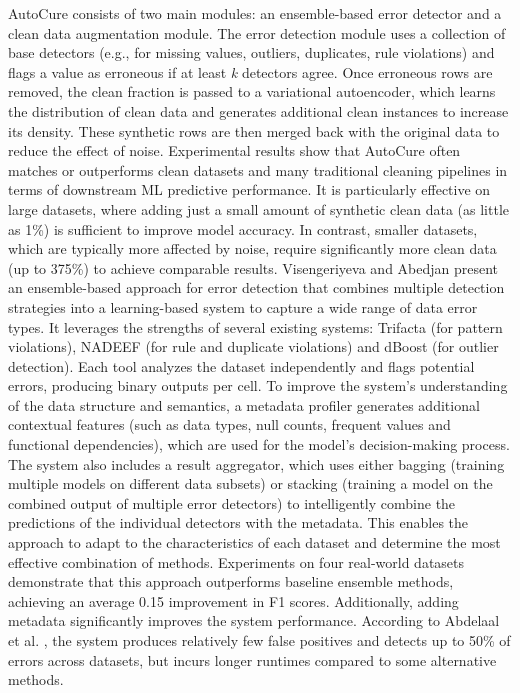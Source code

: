AutoCure consists of two main modules: an ensemble-based error detector and a clean data augmentation module. 
The error detection module uses a collection of base detectors (e.g., for missing values, outliers, duplicates, rule violations) and flags a value as erroneous if at least \textit{k} detectors agree. 
Once erroneous rows are removed, the clean fraction is passed to a variational autoencoder, which learns the distribution of clean data and generates additional clean instances to increase its density. 
These synthetic rows are then merged back with the original data to reduce the effect of noise.
Experimental results show that AutoCure often matches or outperforms clean datasets and many traditional cleaning pipelines in terms of downstream ML predictive performance. 
It is particularly effective on large datasets, where adding just a small amount of synthetic clean data (as little as 1\%) is sufficient to improve model accuracy. 
In contrast, smaller datasets, which are typically more affected by noise, require significantly more clean data (up to 375\%) to achieve comparable results.
\newline\newline
Visengeriyeva and Abedjan \cite{METADRIVEN} present an ensemble-based approach for error detection that combines multiple detection strategies into a learning-based system to capture a wide range of data error types. 
It leverages the strengths of several existing systems: Trifacta (for pattern violations), NADEEF (for rule and duplicate violations) and dBoost (for outlier detection). 
Each tool analyzes the dataset independently and flags potential errors, producing binary outputs per cell. 
To improve the system's understanding of the data structure and semantics, a metadata profiler generates additional contextual features (such as data types, null counts, frequent values and functional dependencies), which are used for the model's decision-making process. 
The system also includes a result aggregator, which uses either bagging (training multiple models on different data subsets) or stacking (training a model on the combined output of multiple error detectors) to intelligently combine the predictions of the individual detectors with the metadata. 
This enables the approach to adapt to the characteristics of each dataset and determine the most effective combination of methods.
Experiments on four real-world datasets demonstrate that this approach outperforms baseline ensemble methods, achieving an average 0.15 improvement in F1 scores. 
Additionally, adding metadata significantly improves the system performance. 
According to Abdelaal et al. \cite{REIN}, the system produces relatively few false positives and detects up to 50\% of errors across datasets, but incurs longer runtimes compared to some alternative methods.

